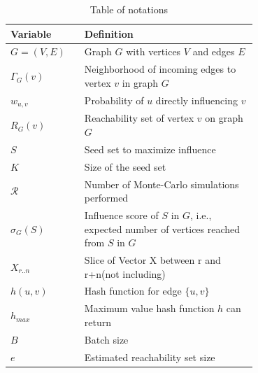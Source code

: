 \documentclass[10pt,journal,compsoc]{IEEEtran}
\begin{document}
\begin{table}[!ht]
    \caption{Table of notations}
    \label{tab:notation}
    \centering
    \begin{tabular}{|l|p{0.7\linewidth}|}
        \hline
        Variable & Definition  \\
        \hline
        $G = (V,E)$     & Graph $G$ with vertices $V$ and edges $E$ \\
        $\Gamma_G(v)$   & Neighborhood of incoming edges to vertex $v$ in graph $G$\\ %
        $w_{u,v}$       & Probability of $u$ directly influencing $v$ \\
        $R_{G}(v)$      & Reachability set of vertex $v$ on graph $G$\\
        \hline\hline
        $S$             & Seed set to maximize influence\\
        $K$             & Size of the seed set\\
        $\mathcal{R}$   & Number of Monte-Carlo simulations performed\\
        $\sigma_{G}(S)$ & Influence score of $S$ in $G$, i.e., expected number of vertices reached from $S$ in $G$\\
\hline\hline
        $X_{r..n}$      & Slice of Vector X between r and r+n(not including)\\
        $h(u,v)$        & Hash function for edge $\{u,v\}$\\
        $h_{max}$       & Maximum value hash function $h$ can return\\
        \hline\hline
        $B$             & Batch size\\
        $e$             & Estimated reachability set size\\

\end{tabular}
\end{table}
\end{document}
